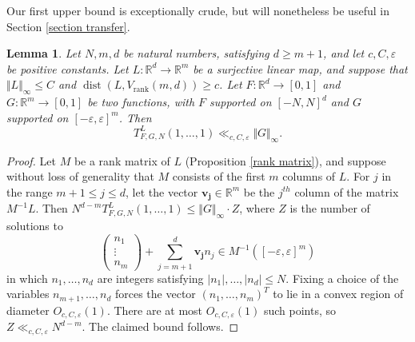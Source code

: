 \documentclass[12pt,a4paper,twoside,reqno]{amsart}
\newtheorem{Lemma}[Theorem]{Lemma}
\newcommand{\rank}{\operatorname{rank}}
\newcommand{\dist}{\operatorname{dist}}
\numberwithin{equation}{section}
\begin{document}
Our first upper bound is exceptionally crude, but will nonetheless be useful in Section \ref{section transfer}. 

\begin{Lemma}
\label{Lemma crude bound on number of solutions}
Let $N,m,d$ be natural numbers, satisfying $d\geqslant m+1$, and let $c,C,\varepsilon$ be positive constants. Let $L:\mathbb{R}^d \longrightarrow \mathbb{R}^m$ be a  surjective linear map, and suppose that $\Vert L \Vert_\infty \leqslant C$ and $\dist (L,V_{\rank}(m,d)) \geqslant c$. Let $F:\mathbb{R}^d \longrightarrow [0,1]$ and $G:\mathbb{R}^m\longrightarrow [0,1]$ be two functions, with $F$ supported on $[-N,N]^d$ and $G$ supported on $[-\varepsilon,\varepsilon]^m$. Then \[ T_{F,G,N}^L(1,\dots,1) \ll_{c,C,\varepsilon} \Vert G \Vert_\infty.\] 
\end{Lemma}
\begin{proof}
Let $M$ be a rank matrix of $L$ (Proposition \ref{rank matrix}), and suppose without loss of generality that $M$ consists of the first $m$ columns of $L$. For $j$ in the range $m+1\leqslant j\leqslant d$, let the vector $\mathbf{v_{j}} \in\mathbb{R}^m$ be the $j^{th}$ column of the matrix $M^{-1} L$. Then $N^{d-m} T_{F,G,N}^L(1,\dots,1) \leqslant \Vert G\Vert_\infty \cdot Z$, where $Z$ is the number of solutions to $$ \left(\begin{matrix} n_1 \\ \vdots\\ n_m \end{matrix}\right) + \sum\limits_{j=m+1}^{d}\mathbf{v_j}n_j \in M^{-1}([-\varepsilon,\varepsilon]^m)$$ in which $n_1,\dots,n_d$ are integers satisfying $\vert n_1\vert,\dots,\vert n_d\vert \leqslant N$. Fixing a choice of the variables $n_{m+1},\dots,n_d$ forces the vector $(n_1,\dots,n_m)^T$ to lie in a convex region of diameter $O_{c,C,\varepsilon}(1)$. There are at most $O_{c,C,\varepsilon}(1)$ such points, so $Z \ll_{c,C,\varepsilon} N^{d-m}$. The claimed bound follows.
\end{proof}
\end{document}
